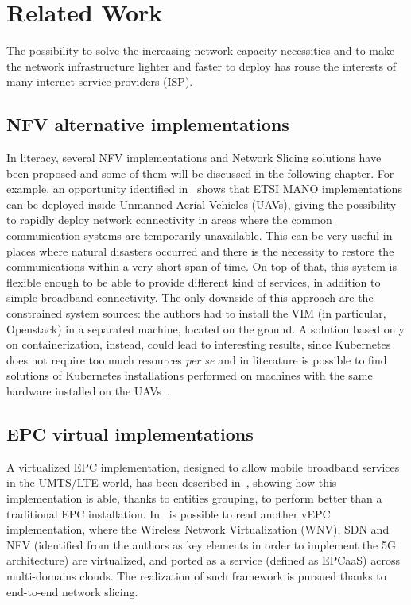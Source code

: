\chapter{Related Work}
\label{chap:rel_wk}


The possibility to solve the increasing network capacity necessities and to make
the network infrastructure lighter and faster to deploy has rouse the interests
of many internet service providers (ISP).

\section{NFV alternative implementations}

In literacy, several NFV implementations and Network Slicing solutions have been
proposed and some of them will be discussed in the following chapter. For
example, an opportunity identified in~\cite{nogales2018nfv} shows that ETSI MANO
implementations can be deployed inside Unmanned Aerial Vehicles (UAVs), giving
the possibility to rapidly deploy network connectivity in areas where the common
communication systems are temporarily unavailable. This can be very useful in
places where natural disasters occurred and there is the necessity to restore
the communications within a very short span of time. On top of that, this system
is flexible enough to be able to provide different kind of services, in addition
to simple broadband connectivity. The only downside of this approach are the
constrained system sources: the authors had to install the VIM (in particular,
Openstack) in a separated machine, located on the ground. A solution based only
on containerization, instead, could lead to interesting results, since
Kubernetes does not require too much resources \textit{per se} and in literature
is possible to find solutions of Kubernetes installations performed on machines
with the same hardware installed on the UAVs~\cite{pahl2016container}.

\section{EPC virtual implementations}

A virtualized EPC implementation, designed to allow mobile broadband services in
the UMTS/LTE world, has been described in~\cite{hawilo2014nfv}, showing how this
implementation is able, thanks to entities grouping, to perform better than a
traditional EPC installation. In~\cite{afolabi2017end} is possible to read
another vEPC implementation, where the Wireless Network Virtualization (WNV),
SDN and NFV (identified from the authors as key elements in order to implement
the 5G architecture) are virtualized, and ported as a service (defined as
EPCaaS) across multi-domains clouds. The realization of such framework is
pursued thanks to end-to-end network slicing.


